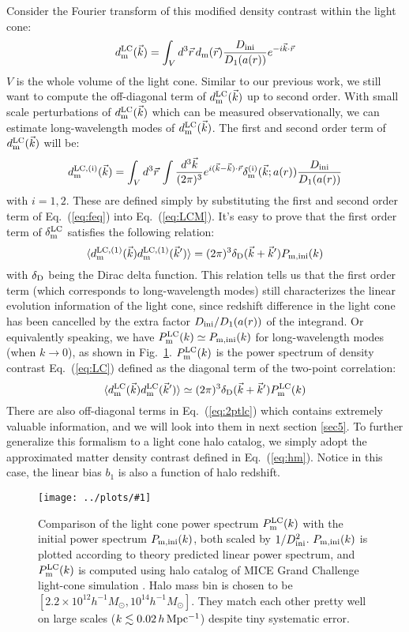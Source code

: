 \documentclass[prd,amsmath,amssymb,floatfix,superscriptaddress,nofootinbib,twocolumn]{revtex4-1}
\def\be{\begin{equation}}
\def\ee{\end{equation}}
\newcommand{\LC}{\rm LC}
\newcommand{\ini}{\rm ini}
\newcommand{\vrr}{\vec{r}}
\newcommand{\vk}{\vec{k}}
\newcommand{\ec}[1]{Eq.~(\ref{eq:#1})}
\newcommand{\eql}[1]{\label{eq:#1}}
\newcommand{\rf}[1]{\ref{fig:#1}}
\newcommand{\sfig}[2]{
\texttt{[image: ../plots/\#1]}
        }
\newcommand{\Sfig}[2]{
   \begin{figure}[thbp]
   \begin{center}
    \sfig{../plots/#1.pdf}{\columnwidth}
    \caption{{\small #2}}
    \label{fig:#1}
     \end{center}
   \end{figure}
}
\begin{document}
\noindent Consider the Fourier transform of this modified density contrast within the light cone:
\be
d^{\LC}_{\rm m}(\vk) =\int_{V} d^3\vrr  \, d_{\rm m}(\vrr) \frac{D_{\ini}}{D_{1}(a(r))}  e^{-i\vk \cdot\vrr} \eql{LCM}
\ee
$V$ is the whole volume of the light cone. Similar to our previous work, we still want to compute the off-diagonal term of $d^{\LC}_{\rm m}(\vk)$ up to second order. With small scale perturbations of $d^{\LC}_{\rm m}(\vk)$ which can be measured observationally, we can estimate long-wavelength modes of $d^{\LC}_{\rm m}(\vk)$. The first and second order term of $d^{\LC}_{\rm m}(\vk)$ will be:
\be 
d^{\LC,(\rm i)}_{\rm m}(\vk)=\int_{V} d^3\vrr  \, \int \frac{d^3 \vk}{(2\pi)^3}e^{i(\vk-\vk)\cdot\vrr}\delta^{(\rm i)}_{\rm m}(\vk;a(r))\frac{D_{\ini}}{D_{1}(a(r))}  \eql{exp}
\ee 
with $i=1,2$. These are defined simply by substituting the first and second order term of \ec{feq} into \ec{LCM}. It's easy to prove that the first order term of $\delta^{\LC}_{\rm m}$ satisfies the following relation:
\be 
\langle d^{\LC,(\rm 1)}_{\rm m}(\vk) d^{\LC,(\rm 1)}_{\rm m}(\vk') \rangle = (2\pi)^3 \delta_{\rm D}(\vk+\vk')P_{\rm m,ini}(k)\eql{lps}
\ee 
with $\delta_{\rm D}$ being the Dirac delta function. This relation tells us that the first order term (which corresponds to long-wavelength modes) still characterizes the linear evolution information of the light cone, since redshift difference in the light cone has been cancelled by the extra factor $D_{\ini}/D_{1}(a(r))$ of the integrand. Or equivalently speaking, we have $P_{\rm m}^{\rm LC}(k)\simeq P_{\rm m,ini}(k)$ for long-wavelength modes (when $k\rightarrow 0$), as shown in Fig.~\rf{psLC}. $P_{\rm m}^{\rm LC}(k)$ is the power spectrum of density contrast \ec{LC} defined as the diagonal term of the two-point correlation:
\be 
\langle d_{\rm m}^{\rm LC} (\vk)d_{\rm m}^{\rm LC}(\vk')\rangle \simeq (2\pi)^3 \delta_{\rm D}(\vk+\vk')P_{\rm m}^{\rm LC}(k) \eql{2ptlc}
\ee 
There are also off-diagonal terms in \ec{2ptlc} which contains extremely valuable information, and we will look into them in next section \ref{sec5}. To further generalize this formalism to a light cone halo catalog, we simply adopt the approximated matter density contrast defined in \ec{hm}. Notice in this case, the linear bias $b_{1}$ is also a function of halo redshift.\

\Sfig{psLC}{Comparison of the light cone power spectrum $P_{\rm m}^{\LC}(k)$ with the initial power spectrum $P_{\rm m,ini}(k)$, both scaled by $1/D_{\ini}^{2}$. $P_{\rm m, ini}(k)$ is plotted according to theory predicted linear power spectrum, and $P_{\rm m}^{\LC}(k)$ is computed using halo catalog of MICE Grand Challenge light-cone simulation \cite{Fosalba:2015MI}\cite{Fosalba:2015MII}. Halo mass bin is chosen to be $[2.2 \times 10^{12}h^{-1}M_{\odot},10^{14}h^{-1}M_{\odot}]$. They match each other pretty well on large scales ($k\lesssim 0.02 \,h\,\rm Mpc^{-1}$) despite tiny systematic error.}
\end{document}
